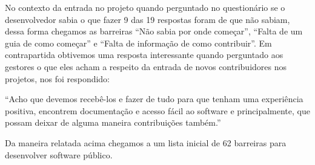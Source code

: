 No contexto da entrada no projeto quando perguntado no questionário se o desenvolvedor
sabia o que fazer 9 das 19 respostas foram de que não sabiam, dessa forma chegamos as
barreiras ``Não sabia por onde começar'', ``Falta de um guia de como começar'' e ``Falta de 
informação de como contribuir''. Em contrapartida obtivemos uma resposta interessante 
quando perguntado aos gestores o que eles acham a respeito da entrada de novos contribuidores
nos projetos, nos foi respondido:

``Acho que devemos recebê-los e fazer de tudo 
para que tenham uma experiência positiva, encontrem documentação e acesso fácil ao 
software e principalmente, que possam deixar de alguma maneira contribuições também.''

Da maneira relatada acima chegamos a um lista inicial de 62 barreiras para desenvolver
software público. 

